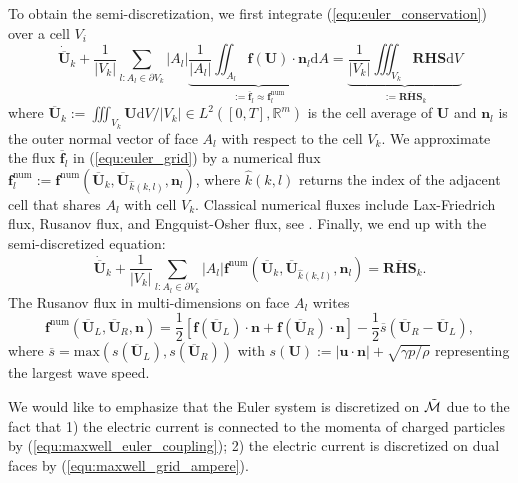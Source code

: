 \documentclass{article}
\begin{document}
To obtain the semi-discretization, we first integrate (\ref{equ:euler_conservation}) over a cell $V_i$ 
\begin{equation} \label{equ:euler_grid} 
    \dot{\overline{\mathbf{U}}}_k + \frac{1}{|V_k|}\sum_{l:A_l\in\partial V_k} |A_l|\underbrace{\frac{1}{|A_l|}\iint_{A_l}\mathbf{f}(\mathbf{U})\cdot \mathbf{n}_l \text{d}A}_{:= \overline{\mathbf{f}}_l \approx \mathbf{f}^\text{num}_l} = \underbrace{\frac{1}{|V_k|}\iiint_{V_k} \mathbf{RHS} \text{d}V}_{:= \overline{\mathbf{RHS}}_k}
\end{equation}
where $\overline{\mathbf{U}}_k := \iiint_{V_k} \mathbf{U} \text{d}V / |V_k| \in L^2([0,T],\mathbb{R}^m)$ is the cell average of $\mathbf{U}$ and $\mathbf{n}_l$ is the outer normal vector of face $A_l$ with respect to the cell $V_k$. We approximate the flux $\overline{\mathbf{f}}_l$ in (\ref{equ:euler_grid}) by a numerical flux $\mathbf{f}^\text{num}_l := \mathbf{f}^\text{num}\left(\overline{\mathbf{U}}_k, \overline{\mathbf{U}}_{\hat{k}(k,l)}, \mathbf{n}_l\right)$, where $\hat{k}(k,l)$ returns the index of the adjacent cell that shares $A_l$ with cell $V_k$. Classical numerical fluxes include Lax-Friedrich flux, Rusanov flux, and Engquist-Osher flux, see \cite[][p. 44-46]{mishra_2019}. Finally, we end up with the semi-discretized equation:
\begin{equation}
    \dot{\overline{\mathbf{U}}}_k + \frac{1}{|V_k|}\sum_{l:A_l\in\partial V_k} |A_l| \mathbf{f}^\text{num}\left(\overline{\mathbf{U}}_k, \overline{\mathbf{U}}_{\hat{k}(k,l)}, \mathbf{n}_l\right) = \overline{\mathbf{RHS}}_k.
    \label{equ:fvm}
\end{equation}
The Rusanov flux in multi-dimensions on face $A_l$ writes
\begin{equation} \label{equ:rusanov-flux-3d}
    \mathbf{f}^\text{num}\left(\overline{\mathbf{U}}_L, \overline{\mathbf{U}}_R, \mathbf{n}\right) = \frac{1}{2}\left[\mathbf{f}(\overline{\mathbf{U}}_L)\cdot\mathbf{n} + \mathbf{f}(\overline{\mathbf{U}}_R)\cdot\mathbf{n}\right] - \frac{1}{2}\overline{s}\left(\overline{\mathbf{U}}_R - \overline{\mathbf{U}}_L\right),  
\end{equation}
where $\overline{s} = \text{max}(s(\overline{\mathbf{U}}_L), s(\overline{\mathbf{U}}_R))$ with $s(\mathbf{U}) := |\mathbf{u}\cdot\mathbf{n}| + \sqrt{\gamma p/\rho}$ representing the largest wave speed. 

We would like to emphasize that the Euler system is discretized on $\Tilde{\mathcal{M}}$ due to the fact that 1) the electric current is connected to the momenta of charged particles by (\ref{equ:maxwell_euler_coupling}); 2) the electric current is discretized on dual faces by (\ref{equ:maxwell_grid_ampere}).
\end{document}
